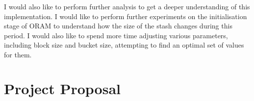 \documentclass[12pt,a4paper,twoside,openright]{report}
\begin{document}
I would also like to perform further analysis to get a deeper understanding of this implementation. I would like to perform further experiments on the initialisation stage of ORAM to understand how the size of the stash changes during this period. I would also like to spend more time adjusting various parameters, including block size and bucket size, attempting to find an optimal set of values for them.



\appendix

\chapter{Project Proposal}


\end{document}
